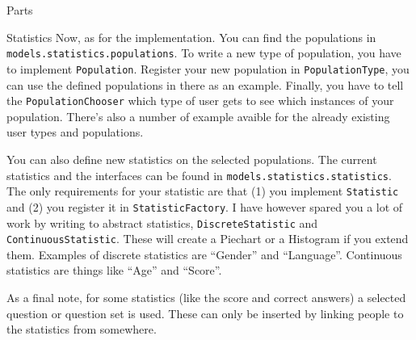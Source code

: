 \documentclass[]{article}
\begin{document}
\begin{section}{Parts}
\begin{subsection}{Statistics}
        Now, as for the implementation. You can find the populations in
        \texttt{models.statistics.populations}. To write a new type of
        population, you have to implement \texttt{Population}. Register your new
        population in \texttt{PopulationType}, you can use the defined
        populations in there as an example. Finally, you have to tell the
        \texttt{PopulationChooser} which type of user gets to see which
        instances of your population. There's also a number of example avaible
        for the already existing user types and populations.

        You can also define new statistics on the selected populations. The
        current statistics and the interfaces can be found in
        \texttt{models.statistics.statistics}. The only requirements for your
        statistic are that (1) you implement \texttt{Statistic} and (2) you
        register it in \texttt{StatisticFactory}. I have however spared you a
        lot of work by writing to abstract statistics,
        \texttt{DiscreteStatistic} and \texttt{ContinuousStatistic}. These will
        create a Piechart or a Histogram if you extend them. Examples of
        discrete statistics are ``Gender'' and ``Language''. Continuous
        statistics are things like ``Age'' and ``Score''.

        As a final note, for some statistics (like the score and correct
        answers) a selected question or question set is used. These can only be
        inserted by linking people to the statistics from somewhere.

    \end{subsection}
\end{section}
\end{document}
